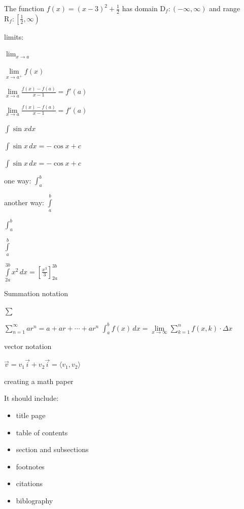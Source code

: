 \documentclass[11pt]{article}
\begin{document}
The function $f(x) = (x-3)^2+ \frac{1}{2}$ has domain $ \mathrm{D}_f:(-\infty,\infty)$
and range $\mathrm{R}_f:\left[\frac{1}{2},\infty\right)$

\vspace{1in}
limits:

$\lim_{x\to a}$

$\lim\limits_{x\to a^+}f(x)$

$\lim\limits_{x \to a} \frac{f(x)-f(a)}{x-1} = f'(a)$

$\displaystyle{\lim\limits_{x \to a} \frac{f(x)-f(a)}{x-1} = f'(a)}$

$\int \sin x dx$

$\int \sin x \,dx = -\cos x +c $ 

$\displaystyle{\int \sin x \,dx = -\cos x +c }$

one way: $\int_a^b$

another way: $\int\limits_a^b$

$\displaystyle{\int_a^b}$

$\displaystyle{\int\limits_a^b}$

$\displaystyle{\int\limits_{2a}^{3b}x^2 \,dx = \left[\frac{x^3}{3}\right]_{2a}^{3b}}$

\vspace{1in}
Summation notation

$\sum$

$\displaystyle{\sum\limits_{n=1}^{\infty} ar^n = a + ar + \cdots + ar^n}$
$\displaystyle{\int_a^b f(x) \,dx = \lim\limits_{x \to \infty} \sum\limits_{k=1}^{n} f(x,k) \cdot \Delta x}$

\vspace{1in}
vector notation

$\vec{v}=v_1 \vec{i}+v_2\vec{i} = \langle v_1,v_2 \rangle$

\vspace{1in}
creating a math paper

It should include:
\begin{itemize}
\item title page
\item table of contents
\item section and subsections
\item footnotes
\item citations
\item biblography
\end{itemize}
\end{document}
